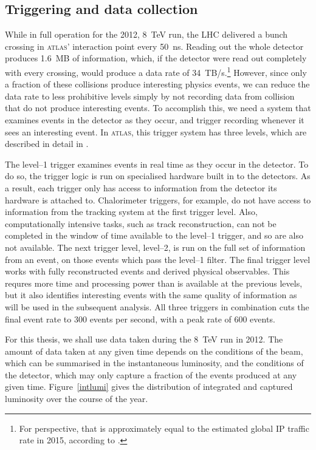 \subsection{Triggering and data collection}
While in full operation for the 2012, 8~TeV run, the LHC delivered a bunch crossing in \textsc{atlas}' interaction point every 50~ns. Reading out the whole detector produces 1.6~MB of information, which, if the detector were read out completely with every crossing, would produce a data rate of 34~TB/s.\footnote{For perspective, that is approximately equal to the estimated global IP traffic rate in 2015, according to \cite{wolframip}.} However, since only a fraction of these collisions produce interesting physics events, we can reduce the data rate to less prohibitive levels simply by not recording data from collision that do not produce interesting events. To accomplish this, we need a system that examines events in the detector as they occur, and trigger recording whenever it sees an interesting event. In \textsc{atlas}, this trigger system has three levels, which are described in detail in \cite{detectorpaper}. 

The level--1 trigger examines events in real time as they occur in the detector. To do so, the trigger logic is run on specialised hardware built in to the detectors. As a result, each trigger only has access to information from the detector its hardware is attached to. Chalorimeter triggers, for example, do not have access to information from the tracking system at the first trigger level. Also, computationally intensive tasks, such as track reconstruction, can not be completed in the window of time available to the level--1 trigger, and so are also not available. The next trigger level, level--2, is run on the full set of information from an event, on those events which pass the level--1 filter. The final trigger level works with fully reconstructed events and derived physical observables. This requres more time and processing power than is available at the previous levels, but it also identifies interesting events with the same quality of information as will be used in the subsequent analysis. All three triggers in combination cuts the final event rate to 300 events per second, with a peak rate of 600 events.

For this thesis, we shall use data taken during the 8~TeV run in 2012. The amount of data taken at any given time depends on the conditions of the beam, which can be summarised in the instantaneous luminosity, and the conditions of the detector, which may only capture a fraction of the events produced at any given time. Figure~\ref{intlumi} gives the distribution of integrated and captured luminosity over the course of the year.

